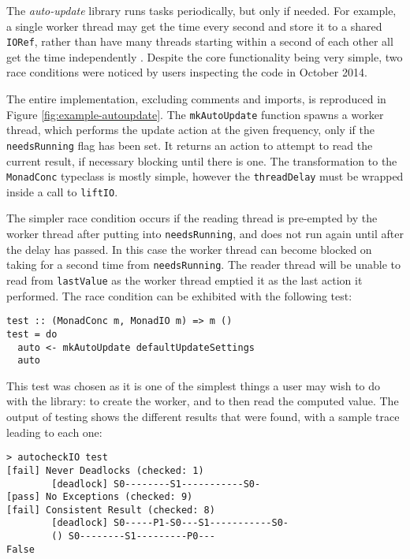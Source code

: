 The \emph{auto-update} library runs tasks periodically, but only if
needed. For example, a single worker thread may get the time every
second and store it to a shared \verb|IORef|, rather than have many
threads starting within a second of each other all get the time
independently \citep{autoupdate}. Despite the core functionality being
very simple, two race conditions were noticed by users inspecting the
code in October 2014.



The entire implementation, excluding comments and imports, is
reproduced in Figure \ref{fig:example-autoupdate}. The
\verb|mkAutoUpdate| function spawns a worker thread, which performs
the update action at the given frequency, only if the
\verb|needsRunning| flag has been set. It returns an action to attempt
to read the current result, if necessary blocking until there is
one. The transformation to the \verb|MonadConc| typeclass is mostly
simple, however the \verb|threadDelay| must be wrapped inside a call
to \verb|liftIO|.

The simpler race condition occurs if the reading thread is pre-empted
by the worker thread after putting into \verb|needsRunning|, and does
not run again until after the delay has passed. In this case the
worker thread can become blocked on taking for a second time from
\verb|needsRunning|. The reader thread will be unable to read from
\verb|lastValue| as the worker thread emptied it as the last action it
performed. The race condition can be exhibited with the following
test:

\begin{verbatim}
test :: (MonadConc m, MonadIO m) => m ()
test = do
  auto <- mkAutoUpdate defaultUpdateSettings
  auto
\end{verbatim}

This test was chosen as it is one of the simplest things a user may
wish to do with the library: to create the worker, and to then read
the computed value. The output of testing shows the different results
that were found, with a sample trace leading to each one:

\begin{verbatim}
> autocheckIO test
[fail] Never Deadlocks (checked: 1)
        [deadlock] S0--------S1-----------S0-
[pass] No Exceptions (checked: 9)
[fail] Consistent Result (checked: 8)
        [deadlock] S0-----P1-S0---S1-----------S0-
        () S0--------S1---------P0---
False
\end{verbatim}


